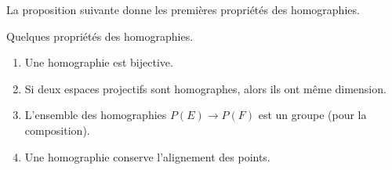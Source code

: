 La proposition suivante donne les premières propriétés des homographies.
\begin{proposition}
    Quelques propriétés des homographies.
    \begin{enumerate}
        \item
            Une homographie est bijective.
        \item
            Si deux espaces projectifs sont homographes, alors ils ont même dimension.
        \item
            L'ensemble des homographies \( P(E)\to P(F)\) est un groupe (pour la composition).
        \item
            Une homographie conserve l'alignement des points.
    \end{enumerate}
\end{proposition}

